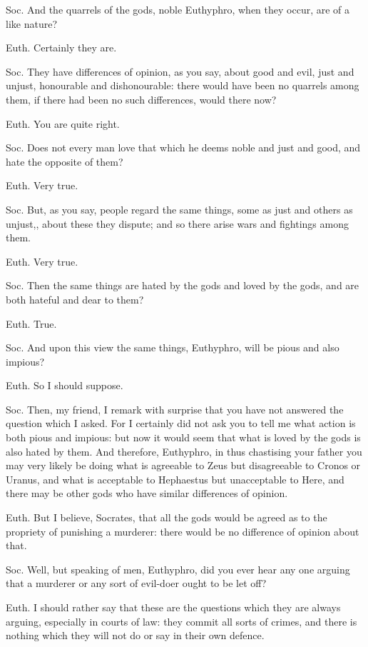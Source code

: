 Soc. And the quarrels of the gods, noble Euthyphro, when they occur, are of a like nature?

Euth. Certainly they are.

Soc. They have differences of opinion, as you say, about good and evil, just and unjust, honourable and dishonourable: there would have been no quarrels among them, if there had been no such differences, would there now?

Euth. You are quite right.

Soc. Does not every man love that which he deems noble and just and good, and hate the opposite of them?

Euth. Very true.

Soc. But, as you say, people regard the same things, some as just and others as unjust,, about these they dispute; and so there arise wars and fightings among them.

Euth. Very true.

Soc. Then the same things are hated by the gods and loved by the gods, and are both hateful and dear to them?

Euth. True.

Soc. And upon this view the same things, Euthyphro, will be pious and also impious?

Euth. So I should suppose.

Soc. Then, my friend, I remark with surprise that you have not answered the question which I asked. For I certainly did not ask you to tell me what action is both pious and impious: but now it would seem that what is loved by the gods is also hated by them. And therefore, Euthyphro, in thus chastising your father you may very likely be doing what is agreeable to Zeus but disagreeable to Cronos or Uranus, and what is acceptable to Hephaestus but unacceptable to Here, and there may be other gods who have similar differences of opinion.

Euth. But I believe, Socrates, that all the gods would be agreed as to the propriety of punishing a murderer: there would be no difference of opinion about that.

Soc. Well, but speaking of men, Euthyphro, did you ever hear any one arguing that a murderer or any sort of evil-doer ought to be let off?

Euth. I should rather say that these are the questions which they are always arguing, especially in courts of law: they commit all sorts of crimes, and there is nothing which they will not do or say in their own defence.

